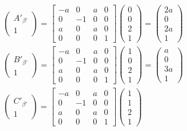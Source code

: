 \begin{gather}
	\begin{pmatrix}
		A'_{\beta'}\\1
	\end{pmatrix}
	=
	\begin{bmatrix}
		-a&0&a&0\\
		0&-1&0&0\\
		a&0&a&0\\
		0&0&0&1
	\end{bmatrix}
	\begin{pmatrix}
		0\\0\\2\\1
	\end{pmatrix}
	=
	\begin{pmatrix}
		2a\\0\\2a\\1
	\end{pmatrix}\\
	\begin{pmatrix}
		B'_{\beta'}\\1
	\end{pmatrix}
	=
	\begin{bmatrix}
		-a&0&a&0\\
		0&-1&0&0\\
		a&0&a&0\\
		0&0&0&1
	\end{bmatrix}
	\begin{pmatrix}
		1\\0\\2\\1
	\end{pmatrix}
	=
	\begin{pmatrix}
		a\\0\\3a\\1
	\end{pmatrix}\\
	\begin{pmatrix}
		C'_{\beta'}\\1
	\end{pmatrix}
	=
	\begin{bmatrix}
		-a&0&a&0\\
		0&-1&0&0\\
		a&0&a&0\\
		0&0&0&1
	\end{bmatrix}
	\begin{pmatrix}
		1\\1\\2\\1

\end{pmatrix}
\end{gather}
